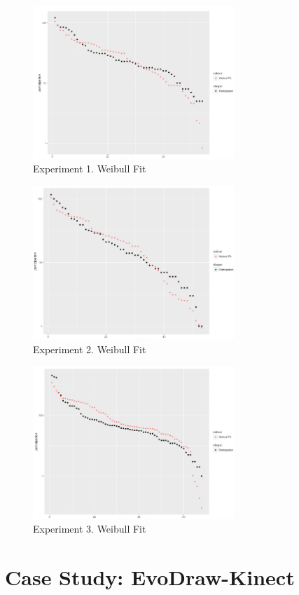 \begin{figure}[!t]
    \centering
        \includegraphics[width=3in]{img/weibull_1.png}
    \caption{Experiment 1. Weibull Fit}
    \label{fig:w1}
\end{figure}
\begin{figure}[!t]
    \centering
        \includegraphics[width=3in]{img/weibull_2.png}
    \caption{Experiment 2. Weibull Fit}
    \label{fig:w2}
\end{figure}
\begin{figure}[!t]
    \centering
        \includegraphics[width=3in]{img/weibull_3.png}
    \caption{Experiment 3. Weibull Fit}
    \label{fig:w3}
\end{figure}


\section{Case Study: EvoDraw-Kinect}

